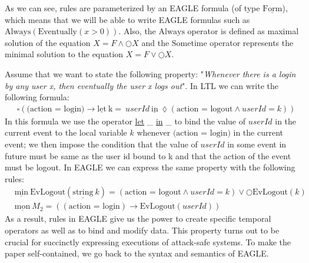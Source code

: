 \documentclass[english]{article}
\begin{document}
As we can see, rules are parameterized by an EAGLE formula (of type $\underline{\text{Form}}$), which means that we will be able to write EAGLE formulas such as $\text{Always}(\text{Eventually}(x>0))$. Also, the $\text{Always}$ operator is defined as maximal solution of the equation $X=F\land \bigcirc X$ and the $\text{Sometime}$ operator represents the minimal solution to the equation $X=F\lor \bigcirc X$.

Assume that we want to state the following property: "\textit{Whenever there is a login by any user x, then eventually the user x logs out}". In LTL we can write the following formula: 
\begin{align*}
    & \square{(\text{(action = login)}\rightarrow \underline{\text{let}}\ \text{k} =\ userId\ \underline{\text{in}}\ \lozenge(\text{action = logout}\land userId = k))}
\end{align*}
In this formula we use the operator \underline{let} \_ \underline{in} \_ to bind the value of $userId$ in the current event to the local variable $k$ whenever $\text{(action = login)}$ in the current event; we then impose the condition that the value of $userId$ in some event in future must be same as the user id bound to k and that the action of the event must be logout.
In EAGLE we can express the same property with the following rules:
\begin{align*}
    & \underline{\text{min}}\ \text{EvLogout}(\underline{\text{string}}\ k) = (\text{action = logout}\land userId = k) \lor \bigcirc \text{EvLogout}(k) \\
    & \underline{\text{mon}}\ M_2 = ((\text{action = login})\rightarrow \text{EvLogout}(userId)) 
\end{align*}
As a result, rules in EAGLE give us the power to create specific temporal operators as well as to bind and modify data. This property turns out to be crucial for succinctly expressing executions of attack-safe systems. To make the paper self-contained, we go back to the syntax and semantics of EAGLE.
\end{document}
